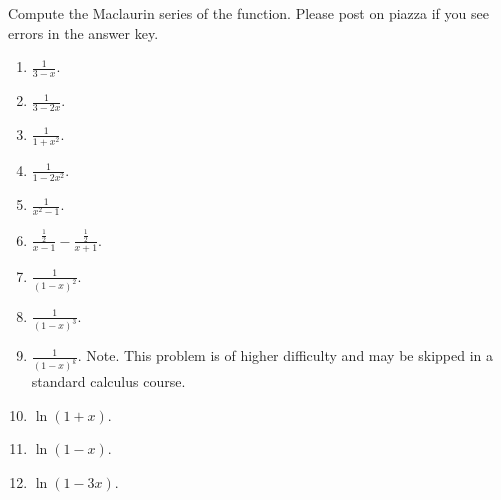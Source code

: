 Compute the Maclaurin series of the function. Please post on piazza if you see errors in the answer key.
\begin{multicols}{2}
\begin{enumerate}
\item $\displaystyle \frac{1}{3-x}$.

\item $\displaystyle \frac{1}{3-2x}$.


\item $\displaystyle \frac{1}{1+x^2}$.


\item $\displaystyle \frac{1}{1-2x^2}$.

\item $\displaystyle \frac{1}{x^2-1}$. \label{problemMaclaurin(1/(x^2-1))}

\item $\displaystyle\frac{\frac12}{x-1}-\frac{\frac12}{x+1}$.

\item $\displaystyle \frac{1}{(1-x)^2}$.

\item $\displaystyle \frac{1}{(1-x)^3}$.


\item $\displaystyle \frac{1}{(1-x)^k}$. {Note. This problem is of higher difficulty and may be skipped in a standard calculus course.} 


\item $\displaystyle\ln (1+x)$.

\item $\ln (1-x)$.

\item $\ln (1-3x)$.


\end{enumerate}
\end{multicols}
